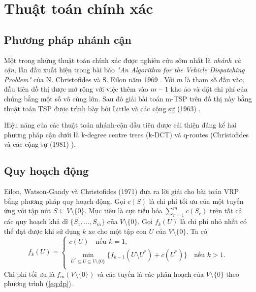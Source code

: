\section{Thuật toán chính xác}

\subsection{Phương pháp nhánh cận}

Một trong những thuật toán chính xác được nghiên cứu sớm nhất là \textit{nhánh và cận}, lần đầu xuất hiện trong bài báo \textit{"An Algorithm for the Vehicle Dispatching Problem"} của N. Christofides và S. Eilon năm 1969 \cite{christofides1969algorithm}. Với $m$ là tham số đầu vào, đầu tiên đồ thị được mở rộng với việc thêm vào $m-1$ kho ảo và đặt chi phí của chúng bằng một số vô cùng lớn. Sau đó giải bài toán m-TSP trên đồ thị này bằng thuật toán TSP được trình bày bởi Little và các cộng sự (1963) \cite{little1963algorithm}.

Hiệu năng của các thuật toán nhánh-cận đầu tiên được cải thiện đáng kể hai phương pháp cận dưới là k-degree centre trees (k-DCT) và q-routes (Christofides và các cộng sự (1981) \cite{christofides1981exact}).

\subsection{Quy hoạch động}

Eilon, Watson-Gandy và Christofides (1971) \cite{christofides1969algorithm} đưa ra lời giải cho bài toán VRP bằng phương pháp quy hoạch động. Gọi $c(S)$ là chi phí tối ưu của một tuyến ứng với tập nút $S \subseteq V \setminus \{0\}$. Mục tiêu là cực tiểu hóa $\sum_{r=1}^{m} c(S_r)$ trên tất cả các quy hoạch khả dĩ $\{S_1,...,S_m\}$ của $V \setminus \{0\}$. Gọi $f_k(U)$ là chi phí nhỏ nhất có thể đạt được khi sử dụng $k$ xe cho một tập con $U$ của $V \setminus \{0\}$. Ta có
\begin{equation}
	\label{eq:dp}
	f_k(U) =
	\begin{cases}
		c(U) \quad \text{nếu } k = 1,                                                                                      \\
		\min_{U^* \subseteq U \subseteq V \setminus \{0\}} \{f_{k-1} (U \setminus U^*) + c(U^*)\} \quad \text{nếu } k > 1. \\
	\end{cases}
\end{equation}
Chi phí tối ưu là $f_m(V \setminus \{0\})$ và các tuyến là các phân hoạch của $V \setminus \{0\}$ theo phương trình (\ref{eq:dp}).

